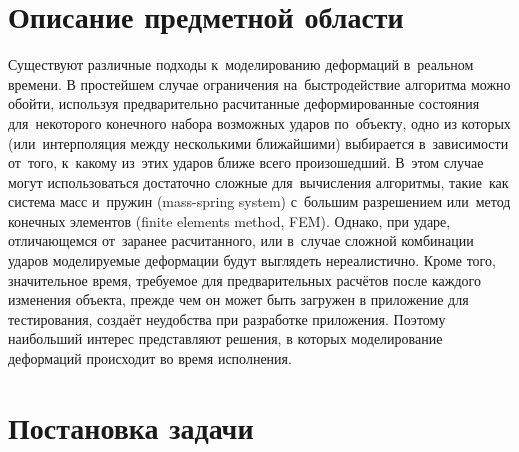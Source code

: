 \documentclass[a4paper,11pt]{report}
\begin{document}
  \chapter{Описание предметной области}

    Существуют различные подходы к~моделированию деформаций в~реальном времени. В простейшем случае
    ограничения на~быстродействие алгоритма можно обойти, используя предварительно расчитанные
    деформированные состояния для~некоторого конечного набора возможных ударов по~объекту, одно из которых
    (или~интерполяция между несколькими ближайшими) выбирается в~зависимости от~того, к~какому
    из~этих ударов ближе всего произошедший. В~этом случае могут использоваться достаточно сложные
    для~вычисления алгоритмы, такие~как система масс и~пружин ({\English mass-spring system})
    с~большим разрешением или~метод конечных элементов ({\English finite elements method, FEM}).
    Однако, при ударе, отличающемся от~заранее расчитанного, или в~случае сложной комбинации ударов
    моделируемые деформации будут выглядеть нереалистично. Кроме того, значительное время, требуемое
    для предварительных расчётов после каждого изменения объекта, прежде чем он может быть загружен
    в приложение для тестирования, создаёт неудобства при разработке приложения. Поэтому наибольший
    интерес представляют решения, в которых моделирование деформаций происходит во время исполнения.

  \chapter{Постановка задачи}
\end{document}
